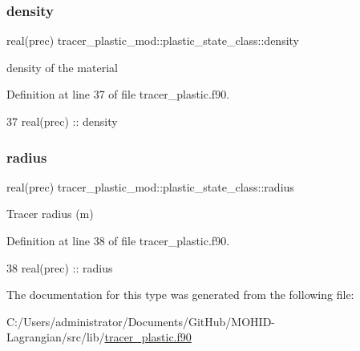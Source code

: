 \subsubsection{\texorpdfstring{density}{density}}
{\footnotesize\ttfamily real(prec) tracer\+\_\+plastic\+\_\+mod\+::plastic\+\_\+state\+\_\+class\+::density\hspace{0.3cm}{\ttfamily [private]}}



density of the material 



Definition at line 37 of file tracer\+\_\+plastic.\+f90.


\begin{DoxyCode}
37         \textcolor{keywordtype}{real(prec)} :: density
\end{DoxyCode}
\mbox{\label{structtracer__plastic__mod_1_1plastic__state__class_a597b5dbe3ba58a0d58d7897fbadaea34}} 
\subsubsection{\texorpdfstring{radius}{radius}}
{\footnotesize\ttfamily real(prec) tracer\+\_\+plastic\+\_\+mod\+::plastic\+\_\+state\+\_\+class\+::radius\hspace{0.3cm}{\ttfamily [private]}}



Tracer radius (m) 



Definition at line 38 of file tracer\+\_\+plastic.\+f90.


\begin{DoxyCode}
38         \textcolor{keywordtype}{real(prec)} :: radius
\end{DoxyCode}


The documentation for this type was generated from the following file\+:\begin{DoxyCompactItemize}
\item 
C\+:/\+Users/administrator/\+Documents/\+Git\+Hub/\+M\+O\+H\+I\+D-\/\+Lagrangian/src/lib/\mbox{\hyperlink{tracer__plastic_8f90}{tracer\+\_\+plastic.\+f90}}\end{DoxyCompactItemize}
